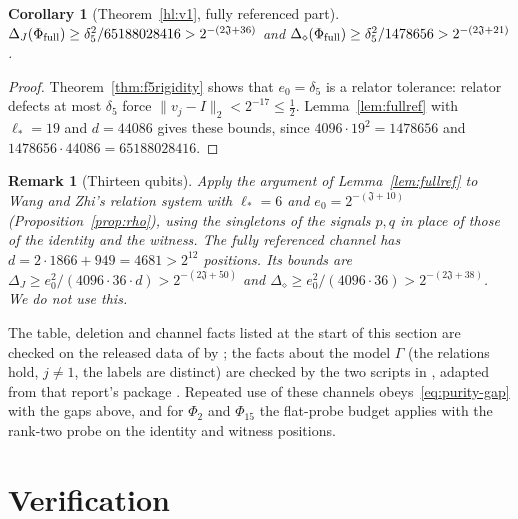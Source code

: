 \documentclass[11pt]{article}
\newtheorem{corollary}[theorem]{Corollary}
\newtheorem{remark}[theorem]{Remark}
\newcommand{\cJ}{\mathfrak J}
\begin{document}
\begin{corollary}[Theorem~\ref{hl:v1}, fully referenced part]\label{cor:full}
$\Delta_J(\Phi_{\rm full})\ge\delta_5^2/65188028416>2^{-(2\cJ+36)}$ and $\Delta_\diamond(\Phi_{\rm full})\ge\delta_5^2/1478656>2^{-(2\cJ+21)}$.
\end{corollary}
\begin{proof}
Theorem~\ref{thm:f5rigidity} shows that $e_0=\delta_5$ is a relator tolerance: relator defects at most $\delta_5$ force $\|v_j-I\|_2<2^{-17}\le\tfrac12$.  Lemma~\ref{lem:fullref} with $\ell_*=19$ and $d=44086$ gives these bounds, since $4096\cdot19^2=1478656$ and $1478656\cdot44086=65188028416$.
\end{proof}

\begin{remark}[Thirteen qubits]\label{rem:13q}
Apply the argument of Lemma~\ref{lem:fullref} to Wang and Zhi's relation system with $\ell_*=6$ and $e_0=2^{-(\cJ+10)}$ (Proposition~\ref{prop:rho}), using the singletons of the signals $p,q$ in place of those of the identity and the witness.  The fully referenced channel has $d=2\cdot1866+949=4681>2^{12}$ positions.  Its bounds are $\Delta_J\ge e_0^2/(4096\cdot36\cdot d)>2^{-(2\cJ+50)}$ and $\Delta_\diamond\ge e_0^2/(4096\cdot36)>2^{-(2\cJ+38)}$.  We do not use this.
\end{remark}

The table, deletion and channel facts listed at the start of this section are checked on the released data of \cite{MghirbiDouglasV1} by ; the facts about the model $\Gamma$ (the relations hold, $j\ne1$, the labels are distinct) are checked by the two scripts in , adapted from that report's package \cite[Appendix~L]{MghirbiDouglasV1}.  Repeated use of these channels obeys~\eqref{eq:purity-gap} with the gaps above, and for $\Phi_2$ and $\Phi_{15}$ the flat-probe budget applies with the rank-two probe on the identity and witness positions.

\section{Verification}\label{sec:repro}
\end{document}
